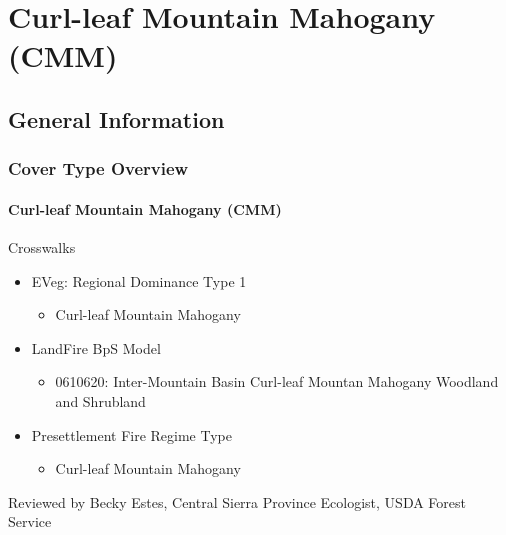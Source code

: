 \newpage
\section{Curl-leaf Mountain Mahogany (CMM)}

\subsection*{General Information}

\subsubsection{Cover Type Overview}

\paragraph{Curl-leaf Mountain Mahogany (CMM)}

Crosswalks
\begin{itemize}
	\item EVeg: Regional Dominance Type 1
	\begin{itemize}
		\item Curl-leaf Mountain Mahogany
	\end{itemize}

	\item LandFire BpS Model
	\begin{itemize}
		\item 0610620: Inter-Mountain Basin Curl-leaf Mountan Mahogany Woodland and Shrubland
	\end{itemize}

	\item Presettlement Fire Regime Type
	\begin{itemize}
		\item Curl-leaf Mountain Mahogany
	\end{itemize}
\end{itemize}

Reviewed by Becky Estes, Central Sierra Province Ecologist, USDA Forest Service

